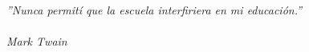 {\newpage
\thispagestyle{empty}
\mbox{ }
\newpage
\thispagestyle{empty}

\newpage
\thispagestyle{empty}

\mbox{ }

\vfill

\begin{flushright}
\begin{minipage}{9cm}
\em{''Nunca permití que la escuela interfiriera en mi educación.''}\\ \\
Mark Twain
\end{minipage}
\end{flushright}

\vfill

\newpage
\thispagestyle{empty}
\mbox{ }

}
